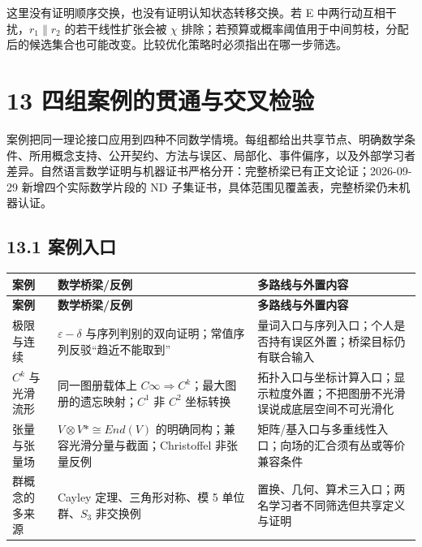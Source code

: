\documentclass[UTF8,a4paper,zihao=-4,fontset=windows,openany]{ctexbook}
\newcommand{\mcsorigin}[1]{\par\noindent{\small\color{black!55}#1}\par\addvspace{0.8em}}
\def\mathrm#1{#1}%
\begin{document}
这里没有证明顺序交换，也没有证明认知状态转移交换。若 E 中两行动互相干扰，\(r_{1}\parallel r_{2}\) 的若干线性扩张会被 \(\chi\) 排除；若预算或概率阈值用于中间剪枝，分配后的候选集合也可能改变。比较优化策略时必须指出在哪一步筛选。

\clearpage\chapter{13 四组案例的贯通与交叉检验}
\mcsorigin{原章节：13-贯通案例.md}
案例把同一理论接口应用到四种不同数学情境。每组都给出共享节点、明确数学条件、所用概念支持、公开契约、方法与误区、局部化、事件偏序，以及外部学习者差异。自然语言数学证明与机器证书严格分开：完整桥梁已有正文论证；2026-09-29 新增四个实际数学片段的 ND 子集证书，具体范围见覆盖表，完整桥梁仍未机器认证。

\section{13.1 案例入口}
\begingroup\small\setlength{\tabcolsep}{4pt}
\begin{longtable}{>{\raggedright\arraybackslash}p{}>{\raggedright\arraybackslash}p{}>{\raggedright\arraybackslash}p{}}
\toprule
\textbf{案例} & \textbf{数学桥梁/反例} & \textbf{多路线与外置内容} \\
\midrule
\endfirsthead
\toprule
\textbf{案例} & \textbf{数学桥梁/反例} & \textbf{多路线与外置内容} \\
\midrule
\endhead
\bottomrule
\endfoot
\bottomrule
\endlastfoot
极限与连续 & \(\varepsilon-\delta\) 与序列判别的双向证明；常值序列反驳“趋近不能取到” & 量词入口与序列入口；个人是否持有误区外置；桥梁目标仍有联合输入 \\
\(C^{k}\) 与光滑流形 & 同一图册载体上 \(C\infty\Rightarrow C^{k}\)；最大图册的遗忘映射；\(C^{1}\) 非 \(C^{2}\) 坐标转换 & 拓扑入口与坐标计算入口；显示粒度外置；不把图册不光滑误说成底层空间不可光滑化 \\
张量与张量场 & \(V\otimes V*\cong\mathrm{End}(V)\) 的明确同构；兼容光滑分量与截面；Christoffel 非张量反例 & 矩阵/基入口与多重线性入口；向场的汇合须有丛或等价兼容条件 \\
群概念的多来源 & Cayley 定理、三角形对称、模 5 单位群、\(S_{3}\) 非交换例 & 置换、几何、算术三入口；两名学习者不同筛选但共享定义与证明 \\
\end{longtable}
\endgroup
\end{document}
